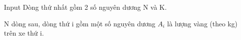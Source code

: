 Input
Dòng thứ nhất gồm 2 số nguyên dương N và K.

N dòng sau, dòng thứ i gồm một số nguyên dương $A_{i}$ là lượng vàng (theo kg) trên xe thứ i.